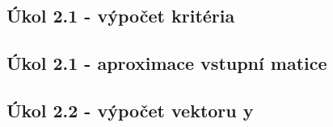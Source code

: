 

\subsection{Úkol 2.1 - výpočet kritéria}



\subsection{Úkol 2.1 - aproximace vstupní matice}



\subsection{Úkol 2.2 - výpočet vektoru y}


